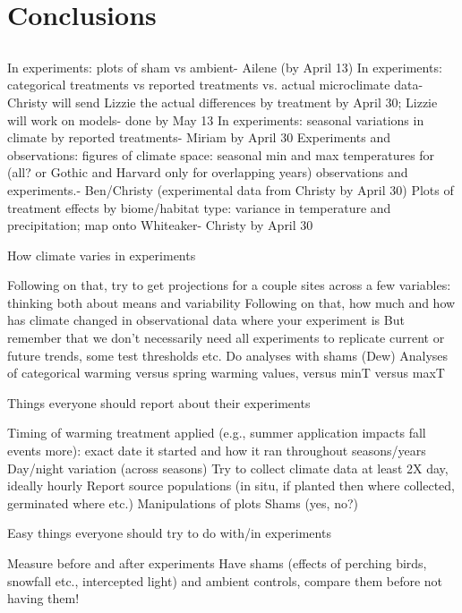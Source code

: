 \documentclass[11pt]{article}
\begin{document}
\section{Conclusions}
 \subsection {}   
    In experiments: plots of sham vs ambient- Ailene (by April 13)
    In experiments: categorical treatments vs reported treatments vs. actual microclimate data- Christy will send Lizzie the actual differences by treatment by April 30; Lizzie will work on models- done by May 13
    In experiments: seasonal variations in climate by reported treatments- Miriam by April 30
    Experiments and observations: figures of climate space: seasonal min and max temperatures for (all? or Gothic and Harvard only for overlapping years) observations and experiments.- Ben/Christy (experimental data from Christy by April 30)
    Plots of treatment effects by biome/habitat type: variance in temperature and precipitation; map onto Whiteaker- Christy by April 30
   
 How climate varies in experiments

    Following on that, try to get projections for a couple sites across a few variables: thinking both about means and variability
    Following on that, how much and how has climate changed in observational data where your experiment is
    But remember that we don't necessarily need all experiments to replicate current or future trends, some test thresholds etc.
    Do analyses with shams
    (Dew)
    Analyses of categorical warming versus spring warming values, versus minT versus maxT

Things everyone should report about their experiments

    Timing of warming treatment applied (e.g., summer application impacts fall events more): exact date it started and how it ran throughout seasons/years
    Day/night variation (across seasons)
    Try to collect climate data at least 2X day, ideally hourly
    Report source populations (in situ, if planted then where collected, germinated where etc.)
    Manipulations of plots
    Shams (yes, no?)

Easy things everyone should try to do with/in experiments

    Measure before and after experiments
    Have shams (effects of perching birds, snowfall etc., intercepted light) and ambient controls, compare them before not having them!
\end{document}
